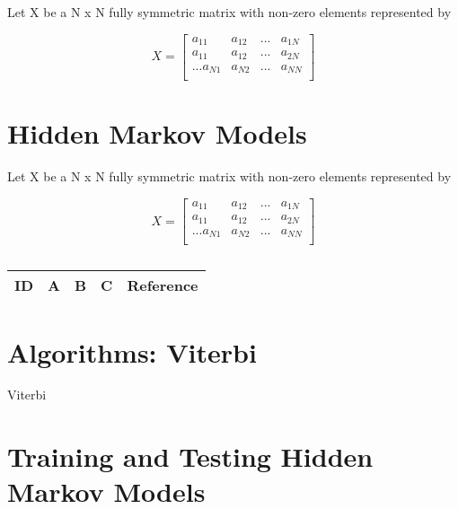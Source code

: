 Let X be a N x N fully symmetric matrix with non-zero elements represented by 

\begin{equation}
X=
\begin{bmatrix}
a_{11} & a_{12} & ... & a_{1N} \\
a_{11} & a_{12} & ... & a_{2N} \\
.
.
.
a_{N1} & a_{N2} & ... & a_{NN} \\
\end{bmatrix}
\end{equation}


\section{Hidden Markov Models}

Let X be a N x N fully symmetric matrix with non-zero elements represented by 

\begin{equation}
X=
\begin{bmatrix}
a_{11} & a_{12} & ... & a_{1N} \\
a_{11} & a_{12} & ... & a_{2N} \\
.
.
.
a_{N1} & a_{N2} & ... & a_{NN} \\
\end{bmatrix}
\end{equation}


\centering
\begin{table}[H]\footnotesize
	\caption{}
	\begin{tabular}{rp{1cm}p{2cm}p{3cm}p{1cm}}
		\hline
		ID & A & B & C & Reference \\
		\hline
		\hline
	\end{tabular}
\end{table}
\raggedright

\section{Algorithms: Viterbi}

\begin{algorithm}[H]
	\footnotesize
	\begin{algorithmic}[1]
	\State 
	\end{algorithmic}
	\caption{Viterbi}\label{Viterbi_1}
\end{algorithm}


\section{Training and Testing Hidden Markov Models}

